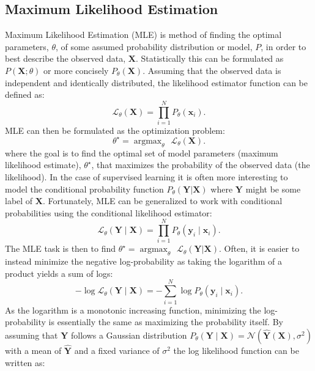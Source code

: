 \documentclass[a4paper,11pt]{article} %
\DeclareMathOperator*{\argmax}{argmax} %
\begin{document}
\subsection{Maximum Likelihood Estimation} \label{sec:MLE}
Maximum Likelihood Estimation (MLE) is method of finding the optimal parameters, $\theta$, of some assumed probability distribution or model, $P$, in order to best describe the observed data, $\mathbf{X}$. Statistically this can be formulated as $P(\mathbf{X}; \theta)$ or more concisely $P_\theta(\mathbf{X})$. Assuming that the observed data is independent and identically distributed, the likelihood estimator function can be defined as:
\begin{equation}
  \mathcal{L}_\theta(\mathbf{X}) = \prod_{i=1}^{N}{P_\theta(\mathbf{x}_i)}.
\end{equation} 
MLE can then be formulated as the optimization problem:
\begin{equation}
  \theta^\star = \argmax_{\theta} \hspace{5pt} \mathcal{L}_\theta(\mathbf{X}).
\end{equation}
where the goal is to find the optimal set of model parameters (maximum likelihood estimate), $\theta^\star$, that maximizes the probability of the observed data (the likelihood). In the case of supervised learning it is often more interesting to model the conditional probability function $P_\theta(\mathbf{Y} | \mathbf{X})$ where $\mathbf{Y}$ might be some label of $\mathbf{X}$. Fortunately, MLE can be generalized to work with conditional probabilities \cite{Goodfellow-et-al-2016} using the conditional likelihood estimator:
\begin{equation}
  \mathcal{L}_\theta(\mathbf{Y} \mid \mathbf{X}) = \prod_{i=1}^{N}{P_\theta(\mathbf{y}_i \mid \mathbf{x}_i)}.
\end{equation}
The MLE task is then to find $\theta^\star = \argmax_{\theta} \hspace{5pt} \mathcal{L}_\theta(\mathbf{Y} | \mathbf{X})$. Often, it is easier to instead minimize the negative log-probability as taking the logarithm of a product yields a sum of logs:
\begin{equation} \label{eq:negative-log-likelihood}
  -\log \mathcal{L}_{\theta}(\mathbf{Y} \mid \mathbf{X}) = -\sum_{i=1}^{N} \log P_{\theta}\left(\mathbf{y}_i \mid \mathbf{x}_i\right).
\end{equation}
As the logarithm is a monotonic increasing function, minimizing the log-probability is essentially the same as maximizing the probability itself. By assuming that $\mathbf{Y}$ follows a Gaussian distribution $P_{\theta}(\mathbf{Y} \mid \mathbf{X}) = \mathcal{N}(\hat{\mathbf{Y}}(\mathbf{X}), \sigma^2)$ with a mean of $\hat{\mathbf{Y}}$ and a fixed variance of $\sigma^2$ the log likelihood function can be written as:
\end{document}

